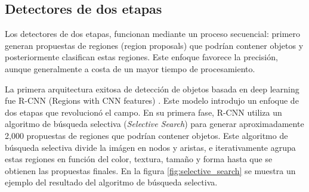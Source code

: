 \documentclass[11pt,spanish,listoffigures,listoftables]{tfgetsinf}
\begin{document}
\subsection{Detectores de dos etapas} \label{sec:two_stage_detectors}
Los detectores de dos etapas, funcionan mediante un proceso secuencial: primero generan propuestas de regiones (region proposals) que podrían contener objetos y posteriormente clasifican estas regiones. Este enfoque favorece la precisión, aunque generalmente a costa de un mayor tiempo de procesamiento.

La primera arquitectura exitosa de detección de objetos basada en deep learning fue R-CNN (Regions with CNN features) \cite{girshick2014richfeaturehierarchiesaccurate}. Este modelo introdujo un enfoque de dos etapas que revolucionó el campo. En su primera fase, R-CNN utiliza un algoritmo de búsqueda selectiva (\textit{Selective Search}\cite{selectiveSearch2012}) para generar aproximadamente 2,000 propuestas de regiones que podrían contener objetos. Este algoritmo de búsqueda selectiva divide la imágen en nodos y aristas, e iterativamente agrupa estas regiones en función del color, textura, tamaño y forma hasta que se obtienen las propuestas finales. En la figura \ref{fig:selective_search} se muestra un ejemplo del resultado del algoritmo de búsqueda selectiva.
\end{document}
